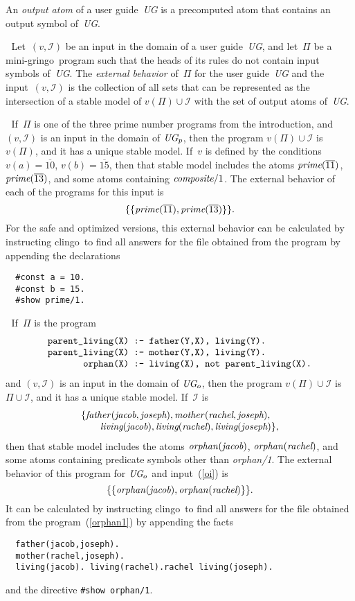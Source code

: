 \documentclass{tlp}
\def\beq{\begin{equation}}
\def\eeq#1{\label{#1}\end{equation}}
\def\ba{\begin{array}}
\def\ea{\end{array}}
\def\gringo{{\sc gringo}}
\def\clingo{{\sc clingo}}
\def\num{\overline}
\newcommand{\I}{\mathcal{I}}
\begin{document}
    An \emph{output atom} of a user guide~\emph{UG} is a precomputed atom
    that contains an output symbol of~\emph{UG}.
    
    \medskip{}$\;$
    Let~$(v,\I)$ be an input in the domain
    of a user guide~\emph{UG}, and let~$\Pi$ be
a mini-\gringo\ program such that the heads of its rules do not
contain input symbols of~\emph{UG}.  The \emph{external behavior} of~$\Pi$
for the user guide~\emph{UG} and the input~$(v,\I)$ is the collection
of all sets that can be represented as the intersection of a stable model
of $v(\Pi)\cup\I$ with the set of output atoms of~\emph{UG}.

\medskip{}$\;$ If~$\Pi$ is one of the
three prime number programs from the introduction, and $(v,\I)$ is an
input in the domain of $\emph{UG}_p$, then the program $v(\Pi)\cup\I$
is $v(\Pi)$, and it has a unique stable model.  If~$v$ is defined by
the conditions
$v(a)=\num{10}$, $v(b)=\num{15}$,
then that stable model includes the atoms $\emph{prime}(\num{11})$,
$\emph{prime}(\num{13})$, and some atoms containing
$\emph{composite}/1$.  The external behavior of each of the programs
for this input is
$$\{\{\emph{prime}(\num{11}),\emph{prime}(\num{13})\}\}.$$
For the safe and optimized versions, this external behavior
can be calculated by instructing \clingo\ to
find all answers for the file obtained from the program by appending the
declarations
\begin{verbatim}
  #const a = 10.
  #const b = 15.
  #show prime/1.
\end{verbatim}

\medskip{}$\;$ If~$\Pi$ is the program
\beq\ba l
\verb|parent_living(X) :- father(Y,X), living(Y).|\\
\verb|parent_living(X) :- mother(Y,X), living(Y).|\\
\verb|       orphan(X) :- living(X), not parent_living(X).|
\ea\eeq{orphan1}
and $(v,\I)$ is an input in the domain of $\emph{UG}_o$, then the
program $v(\Pi)\cup\I$ is $\Pi\cup\I$, and it has a unique stable model.
If~$\I$ is
\beq\ba l
\{\emph{father\/}(\emph{jacob},\emph{joseph}),
\emph{mother\/}(\emph{rachel},\emph{joseph}),\\
\quad \quad \emph{living}(\emph{jacob}),
\emph{living}(\emph{rachel}),
\emph{living}(\emph{joseph})\},
\ea\eeq{oi}
then that stable model includes the atoms
$\emph{orphan\/}(\emph{jacob})$, $\emph{orphan\/}(\emph{rachel})$,
and some atoms containing predicate symbols other than \emph{orphan/1}.
The external behavior of this program for $\emph{UG}_o$ and input~(\ref{oi})
is
\beq
\{\{\emph{orphan\/}(\emph{jacob}),\emph{orphan\/}(\emph{rachel})\}\}.
\eeq{ebor}
It can be calculated by instructing \clingo\ to
find all answers for the file obtained from the program~(\ref{orphan1}) by appending the
facts
\begin{verbatim}
  father(jacob,joseph).
  mother(rachel,joseph).
  living(jacob). living(rachel).rachel living(joseph).
\end{verbatim}
and the directive \verb|#show orphan/1|.
\end{document}
